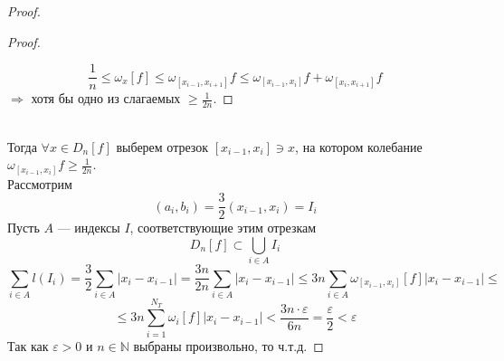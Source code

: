 \documentclass[11pt]{article}
\begin{document}
\begin{proof}
\begin{proof}
\begin{figure}[H]
    \end{figure}
    \[ \frac{1}{n} \le \omega_x[f] \le \omega_{[x_{i-1},x_{i+1}]}f \le \omega_{[x_{i-1},x_i]}f + \omega_{[x_i,x_{i+1}]}f \]
    $\Rightarrow$ хотя бы одно из слагаемых $\ge \frac{1}{2n} $.
    \end{proof} \leavevmode
    \\
    Тогда $\forall x\in D_n[f]$ выберем отрезок $[x_{i-1},x_i]\ni x$, на котором колебание $\omega_{[x_{i-1},x_i]}f \ge \frac{1}{2n}$. \\
    Рассмотрим 
    \[ (a_i,b_i)=\frac{3}{2}(x_{i-1},x_i)=I_i \]
    Пусть $A$ --- индексы $I$, соответствующие этим отрезкам
    \[ D_n[f] \subset \bigcup_{i\in A} I_i \]
    \[ \sum_{i\in A} l(I_i) = \frac{3}{2} \sum_{i\in A} |x_i-x_{i-1}|= \frac{3n}{2n} \sum_{i\in A} |x_i-x_{i-1}|\le 3n \sum_{i\in A} \omega_{[x_{i-1},x_i]}[f]|x_i-x_{i-1}| \le \]
    \[ \le 3n\sum_{i=1}^{N_T} \omega_i[f] |x_i-x_{i-1}| < \frac{3n\cdot \varepsilon}{6n} = \frac{\varepsilon}{2} < \varepsilon \]
    Так как $\varepsilon>0 $ и $n\in \mathbb{N}$ выбраны произвольно, то ч.т.д.
\end{proof}
\end{document}
